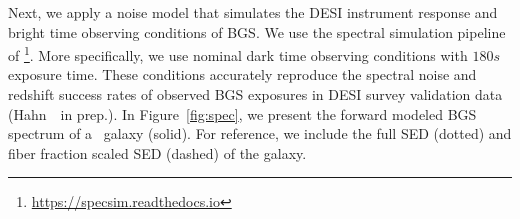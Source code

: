 Next, we apply a noise model that simulates the DESI instrument response and
bright time observing conditions of BGS. 
We use the spectral simulation pipeline of 
\footnote{\href{https://specsim.readthedocs.io/en/stable/guide.html}{https://specsim.readthedocs.io}}. 
More specifically, we use nominal dark time observing conditions with $180s$
exposure time. 
These conditions accurately reproduce the spectral noise and redshift success
rates of observed BGS exposures in DESI survey validation data (Hahn~\etal~in
prep.).
In Figure~\ref{fig:spec}, we present the forward modeled BGS spectrum of a
\lgal~galaxy (solid). 
For reference, we include the full SED (dotted) and fiber fraction scaled SED
(dashed) of the galaxy. 



